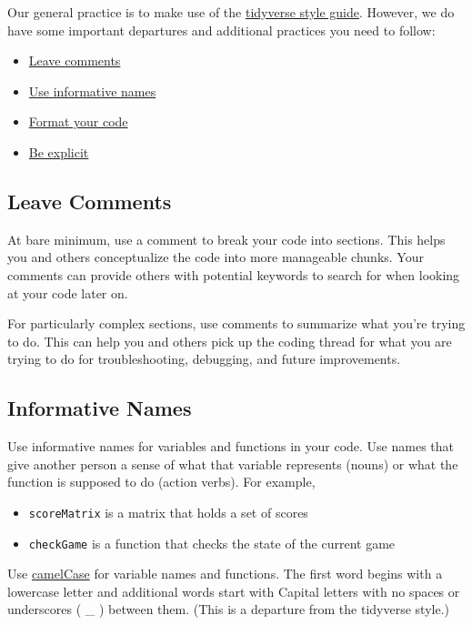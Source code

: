 \documentclass[
]{book}
\providecommand{\tightlist}{%
  \setlength{\itemsep}{0pt}\setlength{\parskip}{0pt}}
\begin{document}
Our general practice is to make use of the \href{https://style.tidyverse.org/}{tidyverse style guide}. However, we do have some important departures and additional practices you need to follow:

\begin{itemize}
\tightlist
\item
  \protect\hyperlink{comments}{Leave comments}
\item
  \protect\hyperlink{naming}{Use informative names}
\item
  \protect\hyperlink{formatCode}{Format your code}
\item
  \protect\hyperlink{explicit}{Be explicit}
\end{itemize}

\hypertarget{comments}{%
\subsection{Leave Comments}\label{comments}}

At bare minimum, use a comment to break your code into sections. This helps you and others conceptualize the code into more manageable chunks. Your comments can provide others with potential keywords to search for when looking at your code later on.

For particularly complex sections, use comments to summarize what you're trying to do. This can help you and others pick up the coding thread for what you are trying to do for troubleshooting, debugging, and future improvements.

\hypertarget{naming}{%
\subsection{Informative Names}\label{naming}}

Use informative names for variables and functions in your code. Use names that give another person a sense of what that variable represents (nouns) or what the function is supposed to do (action verbs). For example,

\begin{itemize}
\tightlist
\item
  \texttt{scoreMatrix} is a matrix that holds a set of scores\\
\item
  \texttt{checkGame} is a function that checks the state of the current game
\end{itemize}

Use \href{https://en.wikipedia.org/wiki/Camel_case}{camelCase} for variable names and functions. The first word begins with a lowercase letter and additional words start with Capital letters with no spaces or underscores ( \_ ) between them. (This is a departure from the tidyverse style.)
\end{document}
